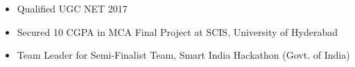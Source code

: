 \divider

\smallskip
\begin{itemize}
\item Qualified UGC NET 2017
\item Secured 10 CGPA in MCA Final Project at SCIS, University of Hyderabad
\item Team Leader for Semi-Finalist Team, Smart India Hackathon (Govt. of India)
\end{itemize}
